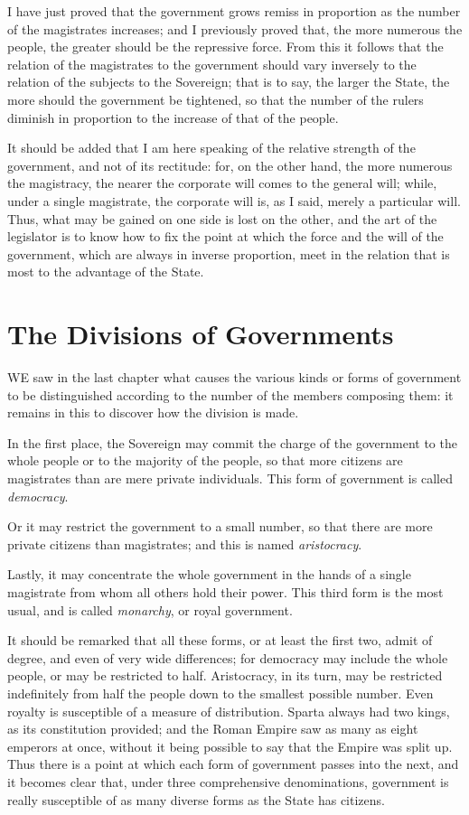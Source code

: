 \documentclass[12pt]{report}
\begin{document}
I have just proved that the government grows remiss in proportion as the number of the magistrates increases; and I previously proved that, the more numerous the people, the greater should be the repressive force. From this it follows that the relation of the magistrates to the government should vary inversely to the relation of the subjects to the Sovereign; that is to say, the larger the State, the more should the government be tightened, so that the number of the rulers diminish in proportion to the increase of that of the people.

It should be added that I am here speaking of the relative strength of the government, and not of its rectitude: for, on the other hand, the more numerous the magistracy, the nearer the corporate will comes to the general will; while, under a single magistrate, the corporate will is, as I said, merely a particular will. Thus, what may be gained on one side is lost on the other, and the art of the legislator is to know how to fix the point at which the force and the will of the government, which are always in inverse proportion, meet in the relation that is most to the advantage of the State.
\clearpage
\section{The Divisions of Governments}
WE saw in the last chapter what causes the various kinds or forms of government to be distinguished according to the number of the members composing them: it remains in this to discover how the division is made.

In the first place, the Sovereign may commit the charge of the government to the whole people or to the majority of the people, so that more citizens are magistrates than are mere private individuals. This form of government is called \textit{democracy}.

Or it may restrict the government to a small number, so that there are more private citizens than magistrates; and this is named \textit{aristocracy}.

Lastly, it may concentrate the whole government in the hands of a single magistrate from whom all others hold their power. This third form is the most usual, and is called \textit{monarchy}, or royal government.

It should be remarked that all these forms, or at least the first two, admit of degree, and even of very wide differences; for democracy may include the whole people, or may be restricted to half. Aristocracy, in its turn, may be restricted indefinitely from half the people down to the smallest possible number. Even royalty is susceptible of a measure of distribution. Sparta always had two kings, as its constitution provided; and the Roman Empire saw as many as eight emperors at once, without it being possible to say that the Empire was split up. Thus there is a point at which each form of government passes into the next, and it becomes clear that, under three comprehensive denominations, government is really susceptible of as many diverse forms as the State has citizens.
\end{document}
